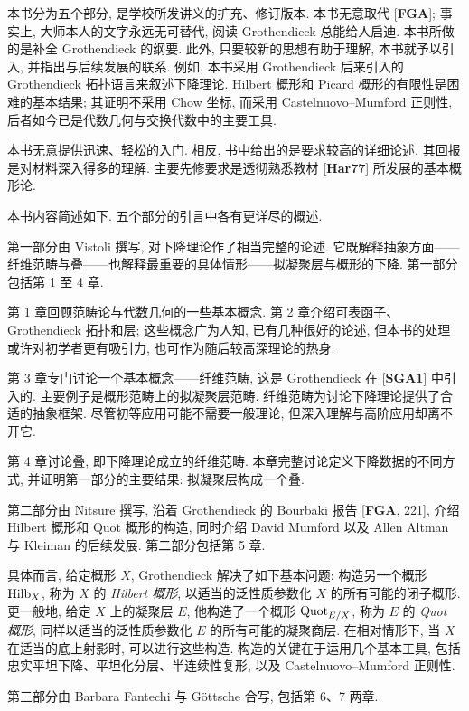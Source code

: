 本书分为五个部分, 是学校所发讲义的扩充、修订版本. 本书无意取代 [\textbf{FGA}]; 事实上, 大师本人的文字永远无可替代, 阅读 Grothendieck 总能给人启迪. 本书所做的是补全 Grothendieck 的纲要. 此外, 只要较新的思想有助于理解, 本书就予以引入, 并指出与后续发展的联系. 例如, 本书采用 Grothendieck 后来引入的 Grothendieck 拓扑语言来叙述下降理论. Hilbert 概形和 Picard 概形的有限性是困难的基本结果; 其证明不采用 Chow 坐标, 而采用 Castelnuovo--Mumford 正则性, 后者如今已是代数几何与交换代数中的主要工具.

本书无意提供迅速、轻松的入门. 相反, 书中给出的是要求较高的详细论述. 其回报是对材料深入得多的理解. 主要先修要求是透彻熟悉教材 [\textbf{Har77}] 所发展的基本概形论.

本书内容简述如下. 五个部分的引言中各有更详尽的概述.

第一部分由 Vistoli 撰写, 对下降理论作了相当完整的论述. 它既解释抽象方面——纤维范畴与叠——也解释最重要的具体情形——拟凝聚层与概形的下降. 第一部分包括第 1 至 4 章.

第 1 章回顾范畴论与代数几何的一些基本概念. 第 2 章介绍可表函子、Grothendieck 拓扑和层; 这些概念广为人知, 已有几种很好的论述, 但本书的处理或许对初学者更有吸引力, 也可作为随后较高深理论的热身.

第 3 章专门讨论一个基本概念——纤维范畴, 这是 Grothendieck 在 [\textbf{SGA1}] 中引入的. 主要例子是概形范畴上的拟凝聚层范畴. 纤维范畴为讨论下降理论提供了合适的抽象框架. 尽管初等应用可能不需要一般理论, 但深入理解与高阶应用却离不开它.

第 4 章讨论叠, 即下降理论成立的纤维范畴. 本章完整讨论定义下降数据的不同方式, 并证明第一部分的主要结果: 拟凝聚层构成一个叠.

第二部分由 Nitsure 撰写, 沿着 Grothendieck 的 Bourbaki 报告 [\textbf{FGA}, 221], 介绍 Hilbert 概形和 Quot 概形的构造, 同时介绍 David Mumford 以及 Allen Altman 与 Kleiman 的后续发展. 第二部分包括第 5 章.

具体而言, 给定概形 $X$, Grothendieck 解决了如下基本问题: 构造另一个概形 $\operatorname{Hilb}_X$, 称为 $X$ 的 \emph{Hilbert 概形}, 以适当的泛性质参数化 $X$ 的所有可能的闭子概形. 更一般地, 给定 $X$ 上的凝聚层 $E$, 他构造了一个概形 $\operatorname{Quot}_{E/X}$, 称为 $E$ 的 \emph{Quot 概形}, 同样以适当的泛性质参数化 $E$ 的所有可能的凝聚商层. 在相对情形下, 当 $X$ 在适当的底上射影时, 可以进行这些构造. 构造的关键在于运用几个基本工具, 包括忠实平坦下降、平坦化分层、半连续性复形, 以及 Castelnuovo--Mumford 正则性.

第三部分由 Barbara Fantechi 与 Göttsche 合写, 包括第 6、7 两章.

